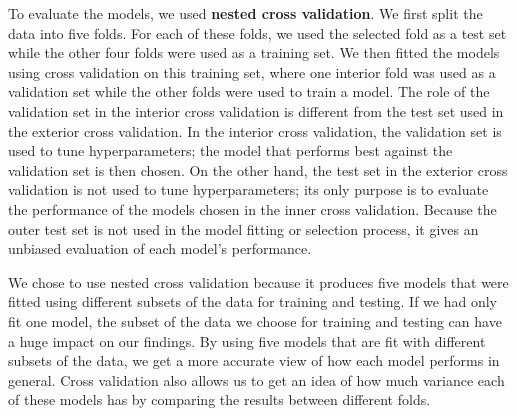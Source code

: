 \documentclass{article}
\begin{document}
	
	To evaluate the models, we used \textbf{nested cross validation}. We first split the data into five folds. For each of these folds, we used the selected fold as a test set while the other four folds were used as a training set. We then fitted the models using cross validation on this training set, where one interior fold was used as a validation set while the other folds were used to train a model. The role of the validation set in the interior cross validation is different from the test set used in the exterior cross validation. In the interior cross validation, the validation set is used to tune hyperparameters; the model that performs best against the validation set is then chosen. On the other hand, the test set in the exterior cross validation is not used to tune hyperparameters; its only purpose is to evaluate the performance of the models chosen in the inner cross validation. Because the outer test set is not used in the model fitting or selection process, it gives an unbiased evaluation of each model's performance.
	
	We chose to use nested cross validation because it produces five models that were fitted using different subsets of the data for training and testing. If we had only fit one model, the subset of the data we choose for training and testing can have a huge impact on our findings. By using five models that are fit with different subsets of the data, we get a more accurate view of how each model performs in general. Cross validation also allows us to get an idea of how much variance each of these models has by comparing the results between different folds.
	
\end{document}
